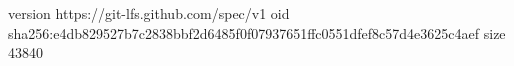 version https://git-lfs.github.com/spec/v1
oid sha256:e4db829527b7c2838bbf2d6485f0f07937651ffc0551dfef8c57d4e3625c4aef
size 43840
